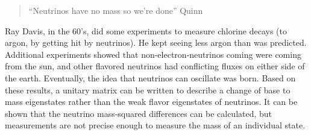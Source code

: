 \documentclass[a4paper,twoside,master.tex]{subfiles}
\begin{document}
\begin{quote}
    ``Neutrinos have no mass so we're done''
    \textemdash Quinn
\end{quote}

Ray Davis, in the 60's, did some experiments to measure chlorine decays (to argon, by getting hit by neutrinos). He kept seeing less argon than was predicted. Additional experiments showed that non-electron-neutrinos coming were coming from the sun, and other flavored neutrinos had conflicting fluxes on either side of the earth. Eventually, the idea that neutrinos can oscillate was born. Based on these results, a unitary matrix can be written to describe a change of base to mass eigenstates rather than the weak flavor eigenstates of neutrinos. It can be shown that the neutrino mass-squared differences can be calculated, but measurements are not precise enough to measure the mass of an individual state.
\end{document}
